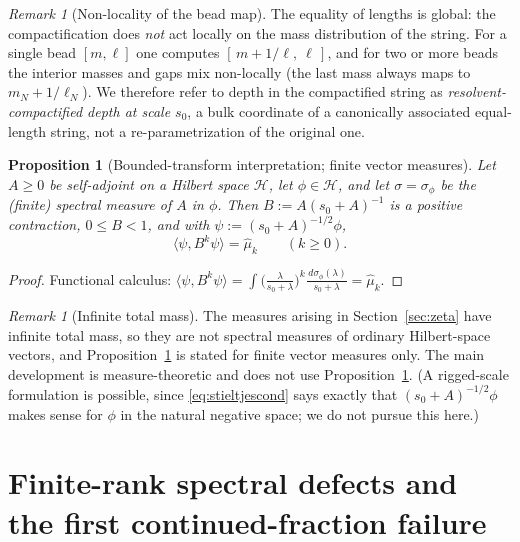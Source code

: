 \documentclass[11pt]{amsart}
\newtheorem{proposition}[theorem]{Proposition}
\theoremstyle{definition}
\theoremstyle{remark}
\newtheorem{remark}[theorem]{Remark}
\newcommand{\dd}{\,d}
\newcommand{\muh}{\widehat{\mu}}
\begin{document}
\begin{remark}[Non-locality of the bead map]
The equality of lengths is global: the compactification does \emph{not} act
locally on the mass distribution of the string. For a single bead
$[m,\ell]$ one computes $[\,m+1/\ell,\ \ell\,]$, and for two or more beads
the interior masses and gaps mix non-locally (the last mass always maps to
$m_N+1/\ell_N$). We therefore refer to depth in the compactified string as
\emph{resolvent-compactified depth at scale $s_0$}, a bulk coordinate of a
canonically associated equal-length string, not a re-parametrization of the
original one.
\end{remark}

\begin{proposition}[Bounded-transform interpretation; finite vector measures]
\label{prop:operator}
Let $A\ge0$ be self-adjoint on a Hilbert space $\mathcal H$, let
$\phi\in\mathcal H$, and let $\sigma=\sigma_\phi$ be the (finite) spectral
measure of $A$ in $\phi$. Then $B:=A(s_0+A)^{-1}$ is a positive contraction,
$0\le B<1$, and with $\psi:=(s_0+A)^{-1/2}\phi$,
\[
\langle\psi,B^k\psi\rangle=\muh_k\qquad(k\ge0).
\]
\end{proposition}

\begin{proof}
Functional calculus: $\langle\psi,B^k\psi\rangle
=\int\big(\tfrac{\lambda}{s_0+\lambda}\big)^k\tfrac{\dd\sigma_\phi(\lambda)}
{s_0+\lambda}=\muh_k$.
\end{proof}

\begin{remark}[Infinite total mass]\label{rem:infmass}
The measures arising in Section~\ref{sec:zeta} have infinite total mass, so
they are not spectral measures of ordinary Hilbert-space vectors, and
Proposition~\ref{prop:operator} is stated for finite vector measures only.
The main development is measure-theoretic and does not use
Proposition~\ref{prop:operator}. (A rigged-scale formulation is possible,
since \eqref{eq:stieltjescond} says exactly that $(s_0+A)^{-1/2}\phi$ makes
sense for $\phi$ in the natural negative space; we do not pursue this here.)
\end{remark}

\section{Finite-rank spectral defects and the first continued-fraction failure}
\label{sec:defects}
\end{document}
